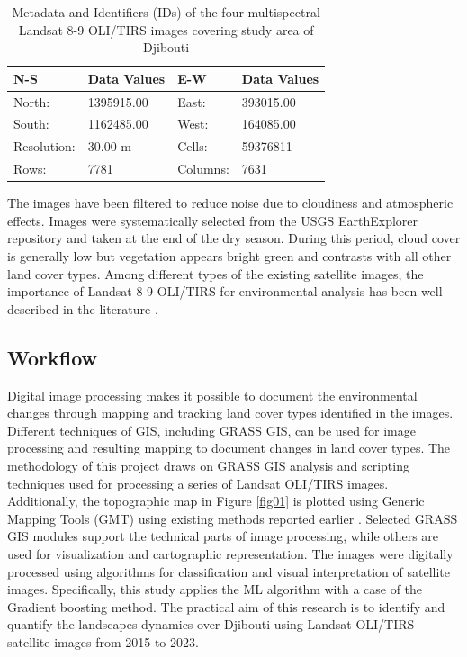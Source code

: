 \documentclass[jimaging,article,submit,pdftex,moreauthors]{Definitions/mdpi}
\begin{document}
\begin{table}[H]
\caption{Metadata and Identifiers (IDs) of the four multispectral Landsat 8-9 OLI/TIRS images covering study area of Djibouti}\label{tab03}
\setlength\tabcolsep{0pt}
\begin{tabularx}{\textwidth}{ X X X X}
\textbf{N-S} & \textbf{Data Values} & \textbf{E-W} & \textbf{Data Values}\\
\midrule
	North: & 1395915.00 &  East: & 393015.00 \\
	South: &  1162485.00 &  West: & 164085.00 \\
	Resolution: &  30.00 m & Cells: & 59376811 \\
	Rows: & 7781 & Columns: & 7631 \\
\bottomrule
\end{tabularx}
\end{table}
 
 The images have been filtered to reduce noise due to cloudiness and atmospheric effects. Images were systematically selected from the USGS EarthExplorer repository and taken at the end of the dry season. During this period, cloud cover is generally low but vegetation appears bright green and contrasts with all other land cover types. Among different types of the existing satellite images, the importance of Landsat 8-9 OLI/TIRS for environmental analysis has been well described in the literature \cite{AKSOY20221072,NESARI2024101989,KUMAR2022100578}.

\subsection{Workflow}

Digital image processing makes it possible to document the environmental changes through mapping and tracking land cover types identified in the images. Different techniques of GIS, including GRASS GIS, can be used for image processing and resulting mapping to document changes in land cover types. The methodology of this project draws on GRASS GIS analysis and scripting techniques used for processing a series of Landsat OLI/TIRS images. Additionally, the topographic map in Figure \ref{fig01} is plotted using Generic Mapping Tools (GMT) using existing methods reported earlier \cite{WRIGHT1998737,Lemenkova202217,9921513,Lemenkova202203,10537274}. Selected GRASS GIS modules support the technical parts of image processing, while others are used for visualization and cartographic representation. The images were digitally processed using algorithms for classification and visual interpretation of satellite images. Specifically, this study applies the ML algorithm with a case of the Gradient boosting method. The practical aim of this research is to identify and quantify the landscapes dynamics over Djibouti using Landsat OLI/TIRS satellite images from 2015 to 2023. 
\end{document}
